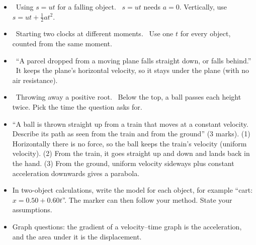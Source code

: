 \begin{mistakes}
\begin{itemize}
  \item \xmark\ Using $s = ut$ for a falling object. \cmark\ $s = ut$ needs $a = 0$. Vertically,
        use $s = ut + \frac{1}{2}at^2$.
  \item \xmark\ Starting two clocks at different moments. \cmark\ Use one $t$ for every object,
        counted from the same moment.
  \item \xmark\ ``A parcel dropped from a moving plane falls straight down, or falls behind.''
        \cmark\ It keeps the plane's horizontal velocity, so it stays under the plane (with no
        air resistance).
  \item \xmark\ Throwing away a positive root. \cmark\ Below the top, a ball passes each height
        twice. Pick the time the question asks for.
\end{itemize}
\end{mistakes}

\begin{examtip}
\begin{itemize}
  \item ``A ball is thrown straight up from a train that moves at a constant velocity. Describe
        its path as seen from the train and from the ground'' (3 marks). (1) Horizontally there
        is no force, so the ball keeps the train's velocity (uniform velocity). (2) From the
        train, it goes straight up and down and lands back in the hand. (3) From the ground,
        uniform velocity sideways plus constant acceleration downwards gives a parabola.
  \item In two-object calculations, write the model for each object, for example
        ``cart: $x = 0.50 + 0.60t$''. The marker can then follow your method. State your
        assumptions.
  \item Graph questions: the gradient of a velocity--time graph is the acceleration, and the
        area under it is the displacement.
\end{itemize}
\end{examtip}

